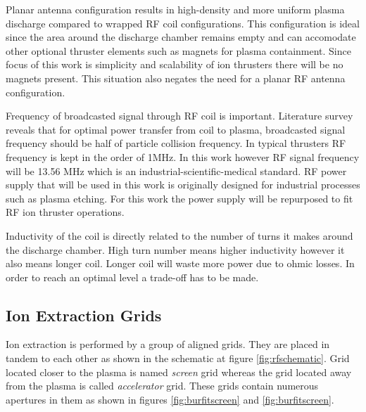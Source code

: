Planar antenna configuration results in high-density and more uniform plasma discharge compared to wrapped RF coil configurations. This configuration is ideal since the area around the 
discharge chamber remains empty and can accomodate other optional thruster elements such as magnets for plasma containment. Since focus of this work is simplicity and scalability of ion thrusters there 
will be no magnets present. This situation also negates the need for a planar RF antenna configuration\cite{gillman2008low}. 

Frequency of broadcasted signal through RF coil is important.  Literature survey reveals that for optimal power transfer from coil to plasma, broadcasted signal frequency should be half of particle collision frequency\cite{holste2018performance}. In typical thrusters RF frequency is kept in the order of 1MHz\cite{goebel2008analytical}. In this work however RF signal frequency will be 13.56 MHz which is an industrial-scientific-medical standard. RF power supply that will be used in this work is originally designed for industrial processes such as plasma etching. For this work the power supply will be repurposed to fit RF ion thruster operations. 

Inductivity of the coil is directly related to the number of turns it makes around the discharge chamber. High turn number means higher inductivity however it also means longer coil. Longer coil will waste more power due to ohmic losses\cite{tsay2012micro}. In order to reach an optimal level a trade-off has to be made. 

\subsection{Ion Extraction Grids}
Ion extraction is performed by a group of aligned grids. They are placed in tandem to each other as shown in the schematic at figure \ref{fig:rfschematic}. Grid located closer to the plasma is named \textit{screen} grid whereas the grid located away from the plasma is called \textit{accelerator} grid. These grids contain numerous apertures in them as shown in figures \ref{fig:burfitscreen} and \ref{fig:burfitscreen}. 

